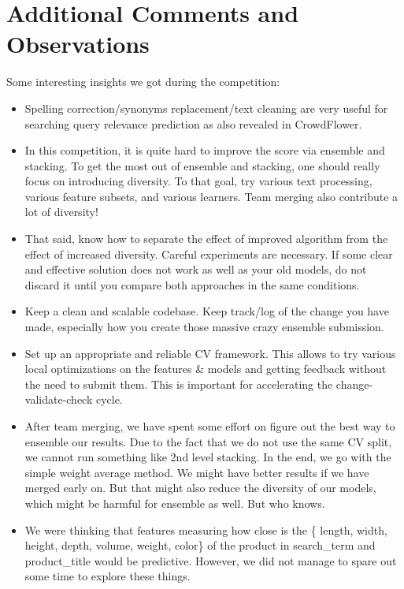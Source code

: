 \documentclass[12pt]{article}
\begin{document}
{{\section{Additional Comments and Observations}
Some interesting insights we got during the competition:
\begin{itemize}
\item Spelling correction/synonyms replacement/text cleaning are very useful for searching query relevance prediction as also revealed in CrowdFlower.
\item In this competition, it is quite hard to improve the score via ensemble and stacking. To get the most out of ensemble and stacking, one should really focus on introducing diversity. To that goal, try various text processing, various feature subsets, and various learners. Team merging also contribute a lot of diversity!
\item That said, know how to separate the effect of improved algorithm from the effect of increased diversity. Careful experiments are necessary. If some clear and effective solution does not work as well as your old models, do not discard it until you compare both approaches in the same conditions.
\item Keep a clean and scalable codebase. Keep track/log of the change you have made, especially how you create those massive crazy ensemble submission.
\item Set up an appropriate and reliable CV framework. This allows to try various local optimizations on the features \& models and getting feedback without the need to submit them. This is important for accelerating the change-validate-check cycle.
\item After team merging, we have spent some effort on figure out the best way to ensemble our results. Due to the fact that we do not use the same CV split, we cannot run something like 2nd level stacking. In the end, we go with the simple weight average method. We might have better results if we have merged early on. But that might also reduce the diversity of our models, which might be harmful for ensemble as well. But who knows.
\item We were thinking that features measuring how close is the \{ length, width, height, depth, volume, weight, color\} of the product in search\_term and product\_title would be predictive. However, we did not manage to spare out some time to explore these things.
\end{itemize}












}}
\end{document}
